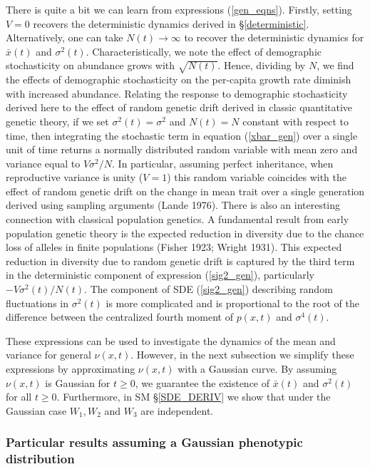 \documentclass[]{article}
\begin{document}
There is quite a bit we can learn from expressions (\ref{gen_eqns}).
Firstly, setting \(V=0\) recovers the deterministic dynamics derived in
\S\ref{deterministic}. Alternatively, one can take \(N(t)\to\infty\) to
recover the deterministic dynamics for \(\bar x(t)\) and
\(\sigma^2(t)\). Characteristically, we note the effect of demographic
stochasticity on abundance grows with \(\sqrt{N(t)}\). Hence, dividing
by \(N\), we find the effects of demographic stochasticity on the
per-capita growth rate diminish with increased abundance. Relating the
response to demographic stochasticity derived here to the effect of
random genetic drift derived in classic quantitative genetic theory, if
we set \(\sigma^2(t)=\sigma^2\) and \(N(t)=N\) constant with respect to
time, then integrating the stochastic term in equation (\ref{xbar_gen})
over a single unit of time returns a normally distributed random
variable with mean zero and variance equal to \(V\sigma^2/N\). In
particular, assuming perfect inheritance, when reproductive variance is
unity (\(V=1\)) this random variable coincides with the effect of random
genetic drift on the change in mean trait over a single generation
derived using sampling arguments (Lande 1976). There is also an
interesting connection with classical population genetics. A fundamental
result from early population genetic theory is the expected reduction in
diversity due to the chance loss of alleles in finite populations
(Fisher 1923; Wright 1931). This expected reduction in diversity due to
random genetic drift is captured by the third term in the deterministic
component of expression (\ref{sig2_gen}), particularly
\(-V\sigma^2(t)/N(t)\). The component of SDE (\ref{sig2_gen}) describing
random fluctuations in \(\sigma^2(t)\) is more complicated and is
proportional to the root of the difference between the centralized
fourth moment of \(p(x,t)\) and \(\sigma^4(t)\).

These expressions can be used to investigate the dynamics of the mean
and variance for general \(\nu(x,t)\). However, in the next subsection
we simplify these expressions by approximating \(\nu(x,t)\) with a
Gaussian curve. By assuming \(\nu(x,t)\) is Gaussian for \(t\geq0\), we
guarantee the existence of \(\bar x(t)\) and \(\sigma^2(t)\) for all
\(t\geq0\). Furthermore, in SM \S\ref{SDE_DERIV} we show that under the
Gaussian case \(W_1,W_2\) and \(W_3\) are independent.

\hypertarget{particular-results-assuming-a-gaussian-phenotypic-distribution}{%
\subsubsection{\texorpdfstring{Particular results assuming a Gaussian
phenotypic distribution
\label{particular}}{Particular results assuming a Gaussian phenotypic distribution }}\label{particular-results-assuming-a-gaussian-phenotypic-distribution}}
\end{document}
